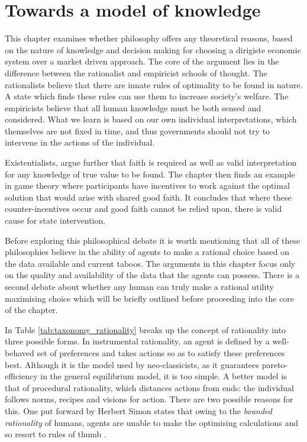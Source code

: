 \chapter{Towards a model of knowledge}

This chapter examines whether philosophy offers any theoretical reasons, based on the nature of knowledge and decision making for choosing a dirigiste economic system over a market driven approach. The core of the argument lies in the difference between the rationalist and empiricist schools of thought. The rationalists believe that there are innate rules of optimality to be found in nature. A state which finds these rules can use them to increase society's welfare. The empiricists believe that all human knowledge must be both sensed and considered. What we learn is based on our own individual interpretations, which themselves are not fixed in time, and thus governments should not try to intervene in the actions of the individual.

Existentialists, argue further that faith is required as well as valid interpretation for any knowledge of true value to be found. The chapter then finds an example in game theory where participants have incentives to work against the optimal solution that would arise with shared good faith. It concludes that where these counter-incentives occur and good faith cannot be relied upon, there is valid cause for state intervention.

Before exploring this philosophical debate it is worth mentioning that all of these philosophies believe in the ability of agents to make a rational choice based on the data available and current taboos. The arguments in this chapter focus only on the quality and availability of the data that the agents can possess. There is a second debate about whether any human can truly make a rational utility maximising choice which will be briefly outlined before proceeding into the core of the chapter.



In Table \ref{tab:taxonomy_rationality} \cite{Hargreaves:1989} breaks up the concept of rationality into three possible forms. In instrumental rationality, an agent is defined by a well-behaved set of preferences and takes actions so as to satisfy these preferences best. Although it is the model used by neo-classicists, as it guarantees pareto-efficiency in the general equilibrium model, it is too simple. A better model is that of procedural rationality, which distances actions from ends: the individual follows norms, recipes and visions for action. There are two possible reasons for this. One put forward by Herbert Simon states that owing to the \textit{bounded rationality} of humans, agents are unable to make the optimising calculations and so resort to rules of thumb \cite{Simon:1982}.

